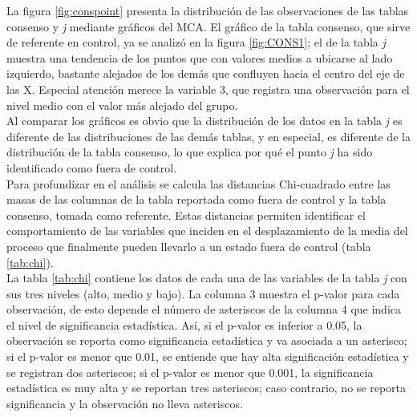 \documentclass[water,article,submit,moreauthors,pdftex]{mdpi}
\begin{document}
La figura \ref{fig:conspoint} presenta la distribución de las
observaciones de las tablas consenso y \emph{j} mediante gráficos del
MCA. El gráfico de la tabla consenso, que sirve de referente en control,
ya se analizó en la figura \ref{fig:CONS1}; el de la tabla \emph{j}
muestra una tendencia de los puntos que con valores medios a ubicarse al
lado izquierdo, bastante alejados de los demás que confluyen hacia el
centro del eje de las X. Especial atención merece la variable 3, que
registra una observación para el nivel medio con el valor más alejado
del grupo.\\
Al comparar los gráficos es obvio que la distribución de los datos en la
tabla \emph{j} es diferente de las distribuciones de las demás tablas, y
en especial, es diferente de la distribución de la tabla consenso, lo
que explica por qué el punto \emph{j} ha sido identificado como fuera de
control.\\
Para profundizar en el análisis se calcula las distancias Chi-cuadrado
entre las masas de las columnas de la tabla reportada como fuera de
control y la tabla consenso, tomada como referente. Estas distancias
permiten identificar el comportamiento de las variables que inciden en
el desplazamiento de la media del proceso que finalmente pueden llevarlo
a un estado fuera de control (tabla \ref{tab:chi}).\\
La tabla \ref{tab:chi} contiene los datos de cada una de las variables
de la tabla \emph{j} con sus tres niveles (alto, medio y bajo). La
columna 3 muestra el p-valor para cada observación, de esto depende el
número de asteriscos de la columna 4 que indica el nivel de
significancia estadística. Así, si el p-valor es inferior a 0.05, la
observación se reporta como significancia estadística y va asociada a un
asterisco; si el p-valor es menor que 0.01, se entiende que hay alta
significación estadística y se registran dos asteriscos; si el p-valor
es menor que 0.001, la significancia estadística es muy alta y se
reportan tres asteriscos; caso contrario, no se reporta significancia y
la observación no lleva asteriscos.
\end{document}
